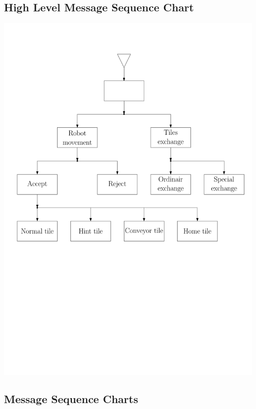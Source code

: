 \subsection{High Level Message Sequence Chart}
	\includegraphics[width=\linewidth,bb=0 0 680 560]{MSC-files/HMSC.pdf}
	
\subsection{Message Sequence Charts}
